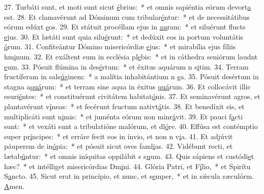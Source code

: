 27. Turbáti sunt, et moti sunt sicut \uline{é}brius:~* et omnis sapiéntia eórum devort\uline{a} est.
28. Et clamavérunt ad Dóminum cum tribular\uline{é}ntur:~* et de necessitátibus eórum edúxt \uline{e}os.
29. Et státuit procéllam ejus in \uline{au}ram:~* et siluérunt flucts \uline{e}jus.
30. Et lætáti sunt quia silu\uline{é}runt:~* et dedúxit eos in portum voluntátis \uline{ó}rum.
31. Confiteántur Dómino misericórdiæ \uline{e}jus:~* et mirabília ejus fíliis hm\uline{i}num.
32. Et exáltent eum in ecclésia pl\uline{e}bis:~* et in cáthedra seniórum laudnt \uline{e}um.
33. Pósuit flúmina in des\uline{é}rtum:~* et éxitus aquárum n s\uline{i}tim.
34. Terram fructíferam in sals\uline{ú}ginem:~* a malítia inhabitántium n \uline{e}a.
35. Pósuit desértum in stagna a\uline{quá}rum:~* et terram sine aqua in éxitus \uline{quá}rum.
36. Et collocávit illic esuri\uline{é}ntes:~* et constituérunt civitátem habitat\uline{ó}nis.
37. Et seminavérunt agros, et plantavérunt v\uline{í}neas:~* et fecérunt fructum nativt\uline{á}tis.
38. Et benedíxit eis, et multiplicáti sunt n\uline{i}mis:~* et juménta eórum non minr\uline{á}vit.
39. Et pauci f\uline{a}cti sunt:~* et vexáti sunt a tribulatióne malórum, et dl\uline{ó}re.
40. Effúsa est contémptio super pr\uline{í}ncipes:~* et erráre fecit eos in ínvio, et non n v\uline{i}a.
41. Et adjúvit páuperem de in\uline{ó}pia:~* et pósuit sicut oves faml\uline{i}as.
42. Vidébunt recti, et lætab\uline{ú}ntur:~* et omnis iníquitas oppilábit s s\uline{u}um.
43. Quis sápiens et custódi\uline{e}t hæc?~* et intélliget misericórdias Dm\uline{i}ni.
44. Glória Patri, et F\uline{í}lio,~* et Spirítu S\uline{a}ncto.
45. Sicut erat in princípio, et nunc, et s\uline{e}mper,~* et in sǽcula sæculórm. \uline{A}men.

